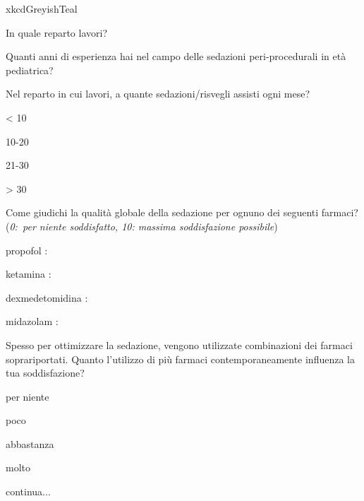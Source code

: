 \begin{survey}{xkcdGreyishTeal}


    
       \Query In quale reparto lavori? 
       
       \Query Quanti anni di esperienza hai nel campo delle sedazioni peri-procedurali in età pediatrica? 
       
       
       \Query Nel reparto in cui lavori, a quante sedazioni/risvegli assisti ogni mese?
       \begin{Qlist}
           \item < 10
           \item 10-20
           \item 21-30
           \item > 30
       \end{Qlist}
       

       \Query Come giudichi la qualità globale della sedazione per ognuno dei seguenti farmaci? (\emph{0:~per niente soddisfatto, 10: massima soddisfazione possibile})
       
       propofol : \hfill {} 
    
       ketamina : \hfill {}
    
        dexmedetomidina : \hfill {}
    
        midazolam : \hfill {}
    
       \Query Spesso per ottimizzare la sedazione, vengono utilizzate combinazioni dei farmaci soprariportati. Quanto l'utilizzo di più farmaci contemporaneamente influenza la tua soddisfazione?
       \begin{Qlist}
           \item per niente
           \item poco
           \item abbastanza
           \item molto
       \end{Qlist}
       
       \hfill continua...
       

\end{survey}
